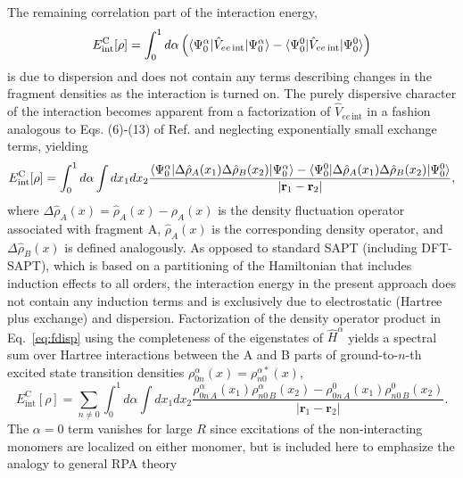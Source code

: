 \documentclass[journal=jctcce,manuscript=article]{achemso}
\begin{document}
The remaining correlation part of the interaction energy,
\begin{equation}
  \label{eq:ecint}
  E^{\text{C}}_{\text{int}}[\rho] = \int_0^1 d\alpha \left( \braket{ \Psi^\alpha_0 |
    \hat{V}_{ee \,\text{int}} | \Psi^\alpha_0 } - \braket{ \Psi^0_0 |
    \hat{V}_{ee \,\text{int}} | \Psi^0_0 } \right)  
\end{equation}
is due to dispersion and does not contain any terms describing changes
in the fragment densities as the interaction is turned on. 
The purely dispersive character of the interaction becomes apparent from
a factorization of $\hat{V}_{ee \,\text{int}}$ 
in a fashion analogous to Eqs. (6)-(13) of
Ref.  and neglecting exponentially
small exchange terms, yielding
\begin{equation}
  \label{eq:fdisp}
  E^{\text{C}}_{\text{int}}[\rho] = \int_0^1 d\alpha \int dx_1 dx_2
  \frac{ \braket{ \Psi^\alpha_0 | \Delta \hat{\rho}_A(x_1) \Delta
      \hat{\rho}_B(x_2) | \Psi^\alpha_0 } - \braket{ \Psi^0_0 |
      \Delta \hat{\rho}_A(x_1) \Delta 
      \hat{\rho}_B(x_2) | \Psi^0_0 }  }{|\mathbf{r}_1-\mathbf{r}_2|},
\end{equation}
where $\Delta \hat{\rho}_A(x) = \hat{\rho}_A(x) - \rho_A(x)$ is the
density fluctuation operator associated with fragment A,
$\hat{\rho}_A(x)$ is the corresponding density operator, and $\Delta
\hat{\rho}_B(x)$ is defined analogously. 
As opposed to standard SAPT (including DFT-SAPT), which is based on a
partitioning of the Hamiltonian that includes induction effects to all
orders, the interaction energy in the present approach 
does not contain any
induction terms and is exclusively due to electrostatic (Hartree plus
exchange) and dispersion. Factorization of the density operator product in
Eq.~\eqref{eq:fdisp} using the completeness of the eigenstates of
$\hat{H}^\alpha$ yields a spectral sum over Hartree
interactions between the A and B parts of  ground-to-$n$-th excited
state transition densities $\rho_{0n}^\alpha(x) = \rho_{n0}^{\alpha *}(x)$, 
\begin{equation}
  \label{eq:edyn}
  E^{\text{C}}_{\text{int}}[\rho] = \sum_{n\ne 0} \int_0^1 d\alpha \int dx_1 dx_2
  \frac{ \rho^\alpha_{0n\,A}(x_1) \rho^\alpha_{n0\,B}(x_2)  -
    \rho^0_{0n\,A}(x_1) \rho^0_{n0\,B}(x_2)
  }{|\mathbf{r}_1-\mathbf{r}_2|}. 
\end{equation}
The $\alpha=0$ term vanishes for large $R$ since excitations of the
non-interacting monomers are localized on either monomer, but is
included here to emphasize the analogy to general RPA theory
\end{document}
